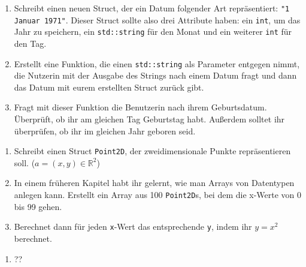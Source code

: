 \begin{praxis}
    \begin{enumerate}
        \item Schreibt einen neuen Struct, der ein Datum folgender Art repräsentiert: \texttt{"1 Januar 1971"}.
              Dieser Struct sollte also drei Attribute haben:
              ein \texttt{int}, um das Jahr zu speichern,
              ein \texttt{std::string} für den Monat
              und ein weiterer \texttt{int} für den Tag.

        \item Erstellt eine Funktion, die einen \texttt{std::string} als Parameter entgegen nimmt, die Nutzerin mit der Ausgabe des Strings nach einem Datum fragt und dann das Datum mit eurem erstellten Struct zurück gibt.

        \item Fragt mit dieser Funktion die Benutzerin nach ihrem Geburtsdatum. Überprüft, ob ihr am gleichen Tag Geburtstag habt.
              Außerdem solltet ihr überprüfen, ob ihr im gleichen Jahr geboren seid.
    \end{enumerate}
\end{praxis}
\begin{praxis}[(Quadratsfunktion)]

    \begin{enumerate}
        \item Schreibt einen Struct \texttt{Point2D}, der zweidimensionale Punkte
              repräsentieren soll. ($a = (x, y) \in \mathbb{R}^2$)
        \item In einem früheren Kapitel habt ihr gelernt, wie man Arrays von
              Datentypen anlegen kann. Erstellt ein Array aus 100 \texttt{Point2D}s, bei dem die
              x-Werte von 0 bis 99 gehen.
        \item Berechnet dann für jeden \texttt{x}-Wert das entsprechende \texttt{y},
              indem ihr $y = x^2$ berechnet.
    \end{enumerate}
\end{praxis}

\begin{spiel}
    \begin{enumerate}
        \item ??
    \end{enumerate}
\end{spiel}